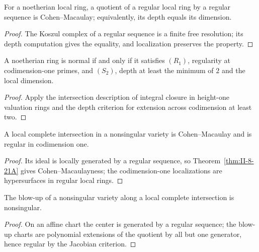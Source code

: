 \begin{theorem}
\label{thm:II-8-21A}
For a noetherian local ring, a quotient of a regular local ring by a regular sequence is
Cohen--Macaulay; equivalently, its depth equals its dimension.
\end{theorem}
\begin{proof}
The Koszul complex of a regular sequence is a finite free resolution; its depth computation gives
the equality, and localization preserves the property.
\end{proof}

\begin{theorem}
\label{thm:II-8-22A}
A noetherian ring is normal if and only if it satisfies $(R_1)$, regularity at codimension-one
primes, and $(S_2)$, depth at least the minimum of $2$ and the local dimension.
\end{theorem}
\begin{proof}
Apply the intersection description of integral closure in height-one valuation rings and the depth
criterion for extension across codimension at least two.
\end{proof}

\begin{proposition}
\label{prop:II-8-23}
A local complete intersection in a nonsingular variety is Cohen--Macaulay and is regular in
codimension one.
\end{proposition}
\begin{proof}
Its ideal is locally generated by a regular sequence, so Theorem~\ref{thm:II-8-21A} gives
Cohen--Macaulayness; the codimension-one localizations are hypersurfaces in regular local rings.
\end{proof}

\begin{theorem}
\label{thm:II-8-24}
The blow-up of a nonsingular variety along a local complete intersection is nonsingular.
\end{theorem}
\begin{proof}
On an affine chart the center is generated by a regular sequence; the blow-up charts are polynomial
extensions of the quotient by all but one generator, hence regular by the Jacobian criterion.
\end{proof}

